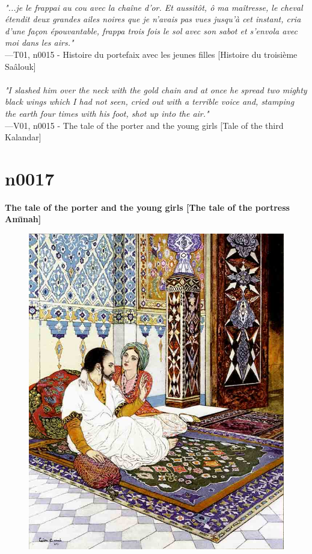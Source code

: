 \documentclass[../Carre_nights.tex]{subfiles}
\begin{document}
\textit{\\
"...je le frappai au cou avec la chaîne d’or. Et aussitôt, ô ma maîtresse, le cheval étendit deux grandes ailes noires que je n’avais pas vues jusqu’à cet instant, cria d’une façon épouvantable, frappa trois fois le sol avec son sabot et s’envola avec moi dans les airs."} \\
—T01, n0015 - Histoire du portefaix avec les jeunes filles [Histoire du troisième Saâlouk] \\~\\
\textit{"I slashed him over the neck with the gold chain and at once he spread two mighty black wings which I had not seen, cried out with a terrible voice and, stamping the earth four times with his foot, shot up into the air."} \\
—V01, n0015 - The tale of the porter and the young girls [Tale of the third Kalandar]

\newpage

\section{n0017}
\textbf{\Large{The tale of the porter and the young girls [The tale of the portress Am\={\i}nah]}} \\

\begin{figure}[ht]
\centering
\includegraphics[height=\figsize]{illustrations/volume_1/T01, n0017 - Histoire du portefaix avec les jeunes filles [Histoire d'Amina].jpg}
\end{figure}
\end{document}
